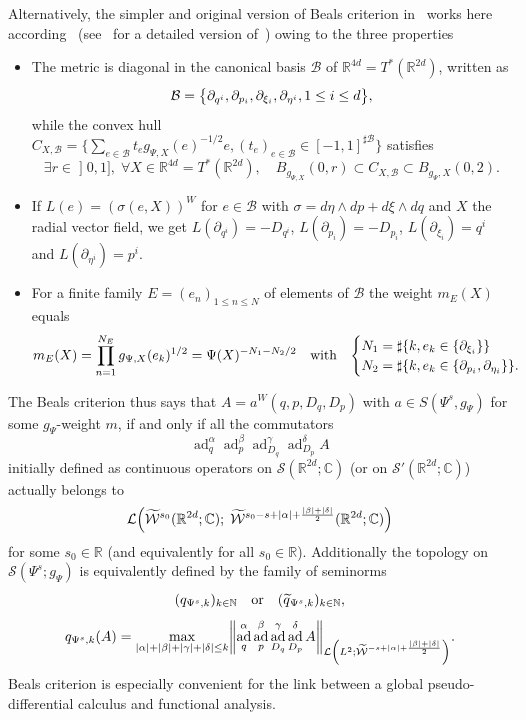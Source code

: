 \documentclass[AHL,Unicode,longabstracts]{cedram}
\newcommand{\C}{\mathbb{C}}
\newcommand{\R}{\mathbb{R}}
\newcommand{\N}{\mathbb{N}}
\newcommand{\clW}{\mathcal{W}}
\newcommand{\clS}{\mathcal{S}}
\newcommand{\clL}{\mathcal{L}}
\newcommand{\clB}{\mathcal{B}}
\DeclareMathOperator{\add}{ad}
\let\oldtilde\tilde
\renewcommand*{\tilde}[1]{\mathchoice{\widetilde{#1}}{\widetilde{#1}}{\oldtilde{#1}}{\oldtilde{#1}}}
\let\oldexists\exists
\renewcommand*{\exists}{\mathrel{\oldexists}}
\let\oldforall\forall
\renewcommand*{\forall}{\mathrel{\oldforall}}
\let\originalleft\left
\let\originalright\right
\renewcommand{\left}{\mathopen{}\mathclose\bgroup\originalleft}
\renewcommand{\right}{\aftergroup\egroup\originalright}
\begin{document}
Alternatively, the simpler and original version of Beals criterion in~\cite{Bea} works here according~\cite{BoCh} (see~\cite{NaNi} for a detailed version of~\cite[Remark~5.6]{BoCh}) owing to the three properties
\begin{itemize}
\item The metric is diagonal in the canonical basis $\clB$ of $\R^{4d}=T^*(\R^{2d})$, written as
\[
\clB=\left\{\partial_{q^{i}},\partial_{p_{i}}, \partial_{\xi_{i}},\partial_{\eta^{i}}, 1\leq i\leq d\right\},
\]
while the convex hull $C_{X,\clB}=\{\sum_{e\in \clB}t_{e}g_{\Psi,X}(e)^{-1/2}e, (t_{e})_{e\in \clB}\in[-1,1]^{\sharp \clB}\}$ satisfies
\[
\exists r\in\mathopen{]}0,1],\; \forall X\in \R^{4d}=T^{*}(\R^{2d}),\quad B_{g_{\Psi,X}}(0,r)\subset C_{X,\clB}\subset B_{g_{\Psi},X}(0,2).
\]
\item If $L(e)=(\sigma(e,X))^{W}$ for $e\in \clB$ with $\sigma = d\eta\wedge dp + d\xi\wedge dq$ and $X$ the radial vector field, we get $L(\partial_{q^{i}})=-D_{q^{i}}$, $L(\partial_{p_{i}})=-D_{p_{i}}$, $L(\partial_{\xi_{i}})=q^{i}$ and $L(\partial_{\eta^{i}})=p^{i}$.
\item For a finite family $E=(e_{n})_{1\leq n\leq N}$ of elements of $\clB$ the weight $m_{E}(X)$ equals
\[
m_{E}(X)=\prod_{n=1}^{N_{E}}g_{\Psi,X}(e_{k})^{1/2}=\Psi(X)^{-N_{1}-N_{2}/2} \quad\text{with}\quad
\begin{cases}
N_{1}=\sharp\left\{k, e_{k}\in \left\{\partial_{\xi_{i}}\right\}\right\}\\
N_{2}=\sharp\left\{k, e_{k}\in \left\{\partial_{p_{i}},\partial_{\eta_{i}}\right\}\right\}.
\end{cases}
\]
\end{itemize}
The Beals criterion thus says that $A=a^{W}(q,p,D_{q},D_{p})$ with $a\in S(\Psi^{s},g_{\Psi})$ for some $g_{\Psi}$-weight $m$, if and only if all the commutators
\[
\add_{q}^{\alpha}\add_{p}^{\beta}\add_{D_{q}}^{\gamma}\add_{D_{p}}^{\delta}A
\]
initially defined as continuous operators on $\clS(\R^{2d};\C)$ (or on $\clS'(\R^{2d};\C)$) actually belongs to
\[
\clL\left(\tilde{\clW}^{s_{0}}(\R^{2d};\C);\;\tilde{\clW}^{s_{0}-s+|\alpha|+\frac{|\beta|+|\delta|}{2}}(\R^{2d};\C)\right)
\]
for some $s_{0}\in \R$ (and equivalently for all $s_{0}\in \R$). Additionally the topology on $\clS(\Psi^{s}; g_{\Psi})$ is equivalently defined by the family of seminorms
\[
(q_{\Psi^{s},k})_{k\in \N} \quad\text{or}\quad (\tilde{q}_{\Psi^{s}, k})_{k\in\N},
\]
\[
q_{\Psi^{s},k}(A)=\max_{|\alpha|+|\beta|+|\gamma|+|\delta|\leq k}\left\|\add_{q}^{\alpha}\add_{p}^{\beta}\add_{D_{q}}^{\gamma}\add_{D_{p}}^{\delta}A\right\|_{\clL\left(L^{2};\widetilde{\clW}^{-s+|\alpha|+\frac{|\beta|+|\delta|}{2}}\right)}.
\]
Beals criterion is especially convenient for the link between a global pseudo-differen\-tial calculus and functional analysis.
\end{document}
